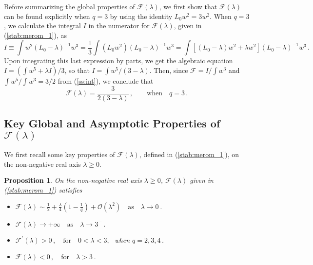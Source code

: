 \documentclass{article}%
\newtheorem{proposition}[theorem]{Proposition}
\begin{document}
Before summarizing the global properties of ${\mathcal F}(\lambda)$,
we first show that $\mathcal{F}(\lambda)$ can be found explicitly when
$q=3$ by using the identity $L_{0}w^{2}=3w^{2}$. When $q=3$, we
calculate the integral $I$ in the numerator for
$\mathcal{F}(\lambda)$, given in (\ref{stab:merom_1}), as
\begin{equation*}
I\equiv\int w^{2}\left(L_{0}-\lambda\right)^{-1}w^{3}= \frac{1}{3}
   \int \left( L_0 w^2 \right) \left(L_{0}-\lambda\right)^{-1}w^{3} =
  \int \left[ (L_0 -\lambda) w^2 + \lambda w^2 \right]
  \left(L_{0}-\lambda\right)^{-1}w^{3} \,.
\end{equation*}
Upon integrating this last expression by parts, we get the algebraic
equation $ I = {\left(\int w^5 + \lambda I\right)/3}$, so that
$I={\int w^5 /(3-\lambda)}$. Then, since ${\mathcal F}={I/\int w^3}$
and ${\int w^5/\int w^3}={3/2}$ from (\ref{ss:int}), we conclude that
\begin{equation}
\mathcal{F}(\lambda)=\frac{3}{2 (3-\lambda)} \,, \qquad \mbox{when} \quad
 q=3 \,. \label{eq:exactF_q3}
\end{equation}

\subsection{Key Global and Asymptotic Properties of $\mathcal{F}(\lambda)$}
\label{sec:nlep_rig}

We first recall some key properties of ${\mathcal F}(\lambda)$, defined
in (\ref{stab:merom_1}), on the non-negative real axis $\lambda\geq 0$.

\begin{proposition}\label{rig:real_f} On the non-negative real axis 
$\lambda \geq 0$, ${\mathcal F}(\lambda)$ given in (\ref{stab:merom_1})
satisfies
\begin{itemize}
\item [{(i)}] ${\mathcal F}(\lambda) \sim \frac{1}{2} + \frac{\lambda}{4}
 \left( 1- \frac{1}{q} \right) + {\mathcal O}(\lambda^2) 
    \quad \mbox{as} \quad \lambda \to 0 \,$.
\item [{(ii)}] ${\mathcal F}(\lambda) \to + \infty \quad \mbox{as}
  \quad \lambda \to 3^{-}\,$.
\item [{(iii)}] ${\mathcal F}^{\prime}(\lambda) >0\,, \quad \mbox{for}  
 \quad 0 < \lambda < 3,\,\,$ when $q=2,3,4\,$.
\item [{(iv)}] ${\mathcal F}(\lambda)<0\,, \quad \mbox{for} \quad 
\lambda>3 \,$.
\end{itemize}
\end{proposition}
\end{document}
